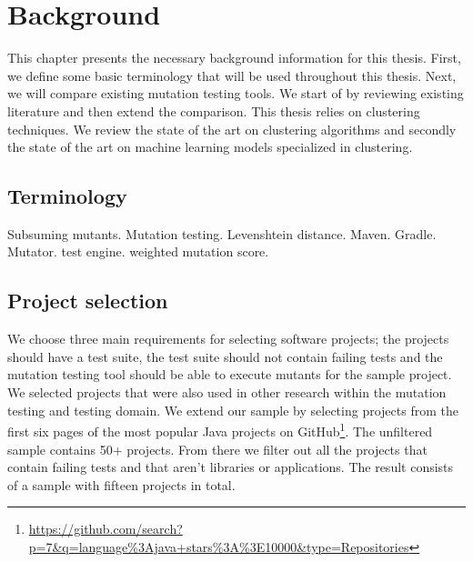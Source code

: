 \documentclass[../main]{subfiles}
\begin{document}
\chapter{Background}
\label{ch:background}
This chapter presents the necessary background information for this thesis. First, we define some basic terminology that will be used throughout this thesis.
Next, we will compare existing mutation testing tools. We start of by reviewing existing literature and then extend the comparison. 
This thesis relies on clustering techniques.
We review the state of the art on clustering algorithms and secondly the state of the art on machine learning models specialized in clustering.

\section{Terminology}
Subsuming mutants.
Mutation testing.
Levenshtein distance.
Maven.
Gradle.
Mutator.
test engine.
weighted mutation score.
\section{Project selection}
\label{ch:project_selection}
We choose three main requirements for selecting software projects; the projects should have a test suite, the test suite should not contain failing tests and the mutation testing tool should be able to execute mutants for the sample project.
We selected projects that were also used in other research within the mutation testing and testing domain\cite{Pizzoleto2019,Yu2019PossibilityScope,Wei2021SpectralTesting, Zhang2019PredictiveTesting, Chen2018SpeedingStudy, Laurent2017AssessingPIT}.
\newline
We extend our sample by selecting projects from the first six pages of the most popular Java projects on GitHub\footnote{\url{https://github.com/search?p=7&q=language\%3Ajava+stars\%3A\%3E10000&type=Repositories}}.
The unfiltered sample contains 50+ projects.
From there we filter out all the projects that contain failing tests and that aren't libraries or applications.
The result consists of a sample with fifteen projects in total.
\end{document}

